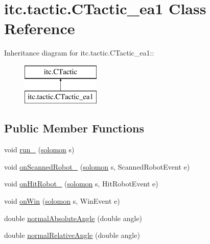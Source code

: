 \hypertarget{classitc_1_1tactic_1_1_c_tactic__ea1}{
\section{itc.tactic.CTactic\_\-ea1 Class Reference}
\label{classitc_1_1tactic_1_1_c_tactic__ea1}
}
Inheritance diagram for itc.tactic.CTactic\_\-ea1::\begin{figure}[H]
\begin{center}
\leavevmode
\includegraphics[height=2cm]{classitc_1_1tactic_1_1_c_tactic__ea1}
\end{center}
\end{figure}
\subsection*{Public Member Functions}
\begin{DoxyCompactItemize}
\item 
void \hyperlink{classitc_1_1tactic_1_1_c_tactic__ea1_ad3c677f7d3fbb5b88ebac50cd465a3cf}{run\_\-} (\hyperlink{classitc_1_1solomon}{solomon} s)
\item 
void \hyperlink{classitc_1_1tactic_1_1_c_tactic__ea1_aa483435460b0ee4fabe62e2d46493c7d}{onScannedRobot\_\-} (\hyperlink{classitc_1_1solomon}{solomon} s, ScannedRobotEvent e)
\item 
void \hyperlink{classitc_1_1tactic_1_1_c_tactic__ea1_a2eb8e76f5f9f629359436a611b8a09e5}{onHitRobot\_\-} (\hyperlink{classitc_1_1solomon}{solomon} s, HitRobotEvent e)
\item 
void \hyperlink{classitc_1_1tactic_1_1_c_tactic__ea1_a796f0c1b21f72300fbbd7cbccc6ef610}{onWin} (\hyperlink{classitc_1_1solomon}{solomon} s, WinEvent e)
\item 
double \hyperlink{classitc_1_1tactic_1_1_c_tactic__ea1_a3b4e695a085e2c955ec3059059df5eb5}{normalAbsoluteAngle} (double angle)
\item 
double \hyperlink{classitc_1_1tactic_1_1_c_tactic__ea1_ad3ae664f65b129510e03e04b83ad2fc2}{normalRelativeAngle} (double angle)
\end{DoxyCompactItemize}
